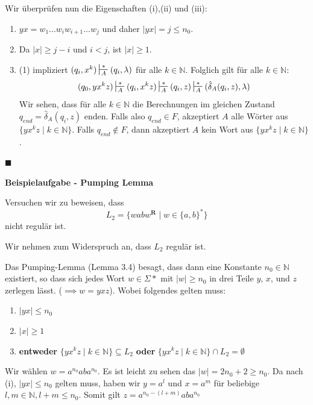 \documentclass[a4paper, 11pt]{article}
\def\N{\mathbb{N}}
\newcommand\myTitle[1]{{\large \textbf {#1}}}
\begin{document}
    Wir überprüfen nun die Eigenschaften (i),(ii) und (iii):
    \begin{enumerate}[label = (\roman*)]
        \item $yx = w_1...w_iw_{i+1}...w_j$ und daher $|yx| = j \leq n_0$.
        \item Da $|x| \geq j-i$ und $i < j$, ist $|x| \geq 1$.
        \item (1) impliziert $(q_i, x^k) \sststile{A}{*} (q_i, \lambda)$ für alle $k \in \N$.
        Folglich gilt für alle $k \in \N$:
        $$(q_0, yx^kz) \sststile{A}{*} (q_i, x^kz) \sststile{A}{*} (q_i, z) \sststile{A}{*} (\hat{\delta}_A(q_i, z), \lambda)$$
        Wir sehen, dass für alle $k \in \N$ die Berechnungen im gleichen Zustand $q_{end} = \hat{\delta}_A(q_i, z)$ enden. Falls also $q_{end} \in F$, akzeptiert $A$ alle Wörter aus $\{yx^kz \mid k \in \N\}$. Falls $q_{end}\notin F$, dann akzeptiert $A$ kein Wort aus $\{yx^kz \mid k \in \N\}$.
    \end{enumerate}
    \hspace*{0pt}\hfill$\blacksquare$



    \myTitle{Beispielaufgabe - Pumping Lemma}

    Versuchen wir zu beweisen, dass 
    $$L_2 = \{wabw^{\textbf{R}} \mid w \in \{a,b\}^*\}$$
    nicht regulär ist.

    Wir nehmen zum Widerspruch an, dass $L_2$ regulär ist. 

Das Pumping-Lemma (Lemma 3.4) besagt, dass dann eine Konstante $n_0 \in \mathbb{N}$ existiert, so dass sich jedes Wort $w \in \Sigma*$ mit $|w| \geq n_0$ in drei Teile $y$, $x$, und $z$ zerlegen lässt. ($\implies w = yxz$). Wobei folgendes gelten muss:
\begin{enumerate}[label=(\roman*)]
    \item  $|yx| \leq n_0$
    \item $|x| \geq 1$
    \item \textbf{entweder} $\{yx^kz \mid k \in \mathbb{N} \} \subseteq L_2$ \textbf{oder} $\{yx^kz \mid k \in \mathbb{N} \} \cap L_2 = \emptyset$
\end{enumerate}

    Wir wählen $w = a^{n_0}aba^{n_0}$. Es ist leicht zu sehen das $|w| = 2n_0 + 2 \geq n_0$. \newline \newline
Da nach (i), $|yx| \leq n_0$ gelten muss, haben wir $y=a^l$ und $x=a^m$ für beliebige $l,m \in \N, l+m \leq n_0$. 
\newline 
Somit gilt $z = a^{n_0 - (l+m)}aba^{n_0}$
\end{document}
